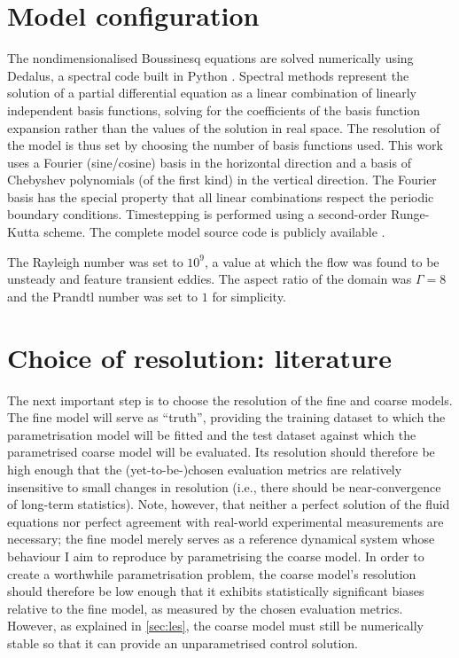 \documentclass[../main.tex]{subfiles}
\begin{document}
\section{Model configuration}
The nondimensionalised Boussinesq equations
 are solved numerically using
Dedalus, a spectral code built in Python \parencite{burns2020}. Spectral
methods represent the solution of a partial differential equation as a linear
combination of linearly independent basis functions, solving for the
coefficients of the basis function expansion rather than the values of the
solution in real space. The resolution of the model is thus set by choosing the
number of basis functions used. This work uses a Fourier (sine/cosine) basis in
the horizontal direction and a basis of Chebyshev polynomials (of the first
kind) in the vertical direction. The Fourier basis has the special property
that all linear combinations respect the periodic boundary conditions.
Timestepping is performed using a second-order Runge-Kutta scheme. The complete
model source code is publicly available .

The Rayleigh number was set to $10^9$, a value at which the flow was found to
be unsteady and feature transient eddies. The aspect ratio of the domain was
$\Gamma = 8$ and the Prandtl number was set to $1$ for simplicity.



\section{Choice of resolution: literature} \label{sec:resolution}
The next important step is to choose the resolution of the fine and coarse
models. The fine model will serve as ``truth'', providing the training dataset
to which the parametrisation model will be fitted and the test dataset against
which the parametrised coarse model will be evaluated. Its resolution should
therefore be high enough that the (yet-to-be-)chosen evaluation metrics are
relatively insensitive to small changes in resolution (i.e., there should be
near-convergence of long-term statistics). Note, however, that neither a
perfect solution of the fluid equations nor perfect agreement with real-world
experimental measurements are necessary; the fine model merely serves as a
reference dynamical system whose behaviour I aim to reproduce by parametrising
the coarse model. In order to create a worthwhile parametrisation problem, the
coarse model's resolution should therefore be low enough that it exhibits
statistically significant biases relative to the fine model, as measured by the
chosen evaluation metrics. However, as explained in \cref{sec:les}, the
coarse model must still be numerically stable so that it can provide an
unparametrised control solution.
\end{document}
